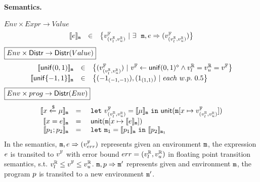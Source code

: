 \documentclass[a4paper,11pt]{article}
\begin{document}
\paragraph{Semantics.}
$\boxed{Env \times Expr \to Value }$
%
\[
	\begin{array}{rcl}
	\llbracket e \rrbracket_{\mathtt{m}}
	& \in &  
	\big\{v^{\mathbb{F}}_{(v^{\mathbb{R}}_{l}, v^{\mathbb{R}}_{u})} ~|~
	\exists ~~  
	\mathtt{m},  
	e \Rightarrow (v^{\mathbb{F}}_{(v^{\mathbb{R}}_{l}, v^{\mathbb{R}}_{u})})\big\}
	\end{array}
\]
%
$
\boxed{Env \times \mathsf{Distr} \to 
\mathsf{Distr}(Value)}
$
%
\[
	\begin{array}{rcl}
	\llbracket \mathsf{unif}(0, 1) \rrbracket_{\mathtt{m}}
	& \in & 
	\big\{
	(v^{\mathbb{F}}_{(v^{\mathbb{R}}_{l}, v^{\mathbb{R}}_{u})}) ~|~
	v^{\mathbb{F}} \leftarrow \mathsf{unif}(0, 1)^{\diamond}
	\land v^{\mathbb{R}}_{l} = v^{\mathbb{R}}_{u} = v^{\mathbb{F}}
	\big\}\\
	\llbracket \mathsf{unif}\{-1, 1\} \rrbracket_{\mathtt{m}}
	& \in & 
	\big\{
	(-1_{(-1, -1)}), (1_{(1, 1)}) ~|~
	each ~ w.p. ~ 0.5 
	\big\}\\	
	\end{array}
\]
%
$\boxed{Env \times prog \to \mathsf{Distr}(Env)}$
\[
\begin{array}{rcl}
	\llbracket x \xleftarrow{\$} \mu \rrbracket_{\mathtt{m}}
	& = & 
	~\mathtt{let}~ v^{\mathbb{F}}_{(v^{\mathbb{R}}_{l}, v^{\mathbb{R}}_{u})} = \llbracket \mu \rrbracket_{\mathtt{m}}
	~\mathtt{in}~ 
	\mathsf{unit}(\mathtt{m}[x \mapsto v^{\mathbb{F}}_{(v^{\mathbb{R}}_{l}, v^{\mathbb{R}}_{u})}])
	\\
	\llbracket x = e \rrbracket_{\mathtt{m}}
	& = &  
	~\mathsf{unit}(\mathtt{m}[x \mapsto \llbracket e \rrbracket_{\mathtt{m}}])
	\\
	\llbracket p_1; p_2 \rrbracket_{\mathtt{m}}
	& = &  ~\mathtt{let}~  \mathtt{m}_1 = 
	\llbracket p_1 \rrbracket_{\mathtt{m}} ~\mathtt{in}~
	\llbracket p_2 \rrbracket_{\mathtt{m}_1} 
\end{array}
\]
%
In the semantics, 
%
$\mathtt{m}, e \Rightarrow (v^{\mathbb{F}}_{err})$ represents given an environment
%
$\mathtt{m}$, the expression $e$
%
is transited to $v^{\mathbb{F}}$ with error bound $err = (v^{\mathbb{R}}_{l}, v^{\mathbb{R}}_{u})$
in floating point transition semantics,
%
s.t. $v^{\mathbb{R}}_{l} \leq v^{\mathbb{F}} \leq v^{\mathbb{R}}_{u}$.
%
$\mathtt{m}, p \Rightarrow \mathtt{m}'$ represents given and environment $\mathtt{m}$,
%
the program $p$ is transited to a new environment $\mathtt{m}'$.
%
%
\end{document}
